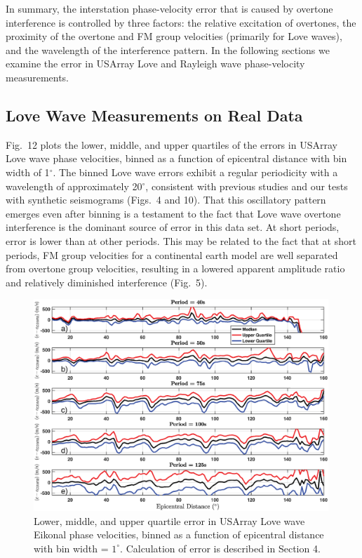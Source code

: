 \documentclass[extra,mreferee]{gji}
\begin{document}
In summary, the interstation phase-velocity error that is caused by overtone interference is controlled by three factors: the relative excitation of overtones, the proximity of the overtone and FM group velocities (primarily for Love waves), and the wavelength of the interference pattern. In the following sections we examine the error in USArray Love and Rayleigh wave phase-velocity measurements.


\subsection{Love Wave Measurements on Real Data}
Fig.\ 12 plots the lower, middle, and upper quartiles of the errors in USArray Love wave phase velocities, binned as a function of epicentral distance with bin width of 1$^\circ$. The binned Love wave errors exhibit a regular periodicity with a wavelength of approximately 20$^\circ$, consistent with previous studies \citep{foster2014overtone} and our tests with synthetic seismograms (Figs.\ 4 and 10). That this oscillatory pattern emerges even after binning is a testament to the fact that Love wave overtone interference is the dominant source of error in this data set. At short periods, error is lower than at other periods. This may be related to the fact that at short periods, FM group velocities for a continental earth model are well separated from overtone group velocities, resulting in a lowered apparent amplitude ratio and relatively diminished interference (Fig.\ 5).

    \begin{figure}
 \includegraphics[width=0.99\textwidth]{Fig12_Sver.eps}
 \caption{Lower, middle, and upper quartile error in USArray Love wave Eikonal phase velocities, binned as a function of epicentral distance with bin width = $1^\circ$. Calculation of error is described in Section 4.}
\end{figure}
\end{document}
